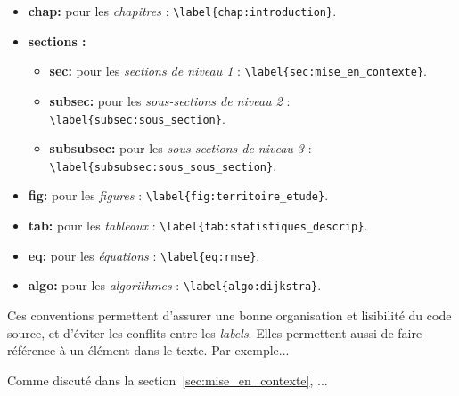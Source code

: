 \begin{itemize}
    \item \textbf{chap:} pour les \textit{chapitres} : \verb|\label{chap:introduction}|.
    \item \textbf{sections :}
    \begin{itemize}
        \item \textbf{sec:} pour les \textit{sections de niveau 1} : \verb|\label{sec:mise_en_contexte}|.
        \item \textbf{subsec:} pour les \textit{sous-sections de niveau 2} : \verb|\label{subsec:sous_section}|.
        \item \textbf{subsubsec:} pour les \textit{sous-sections de niveau 3} : 
        \lstinline|\label{subsubsec:sous_sous_section}|.
    \end{itemize}
    \item \textbf{fig:} pour les \textit{figures} : \verb|\label{fig:territoire_etude}|.
    \item \textbf{tab:} pour les \textit{tableaux} : \verb|\label{tab:statistiques_descrip}|.
    \item \textbf{eq:} pour les \textit{équations} : \verb|\label{eq:rmse}|.
    \item \textbf{algo:} pour les \textit{algorithmes} : \verb|\label{algo:dijkstra}|.
\end{itemize}

Ces conventions permettent d'assurer une bonne organisation et lisibilité du code source, et d'éviter les conflits entre les \textit{labels}. Elles permettent aussi de faire référence à un élément dans le texte. Par exemple...

Comme discuté dans la section~\ref{sec:mise_en_contexte}, ...
